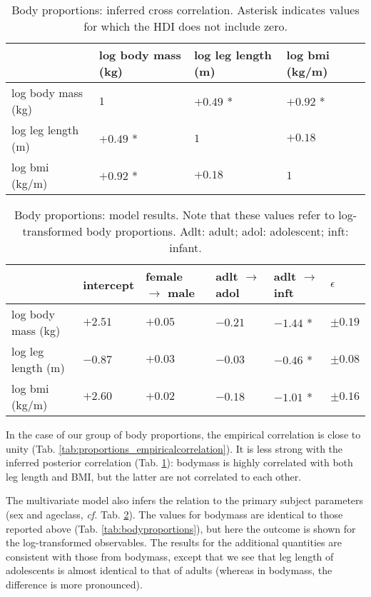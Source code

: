 \begin{table}[htbp]
\caption{\label{tab:proportions_correlation}Body proportions: inferred cross correlation. Asterisk indicates values for which the HDI does not include zero.}
\centering
\begin{tabular}{llll}
 & log body mass (kg) & log leg length (m) & log bmi (kg/m)\\[0pt]
\hline
log body mass (kg) & \(1\) & \(+0.49\) * & \(+0.92\) *\\[0pt]
log leg length (m) & \(+0.49\) * & \(1\) & \(+0.18\)\\[0pt]
log bmi (kg/m) & \(+0.92\) * & \(+0.18\) & \(1\)\\[0pt]
\end{tabular}
\end{table}

\begin{table}[htbp]
\caption{\label{tab:proportions_predictors}Body proportions: model results. Note that these values refer to log-transformed body proportions. Adlt: adult; adol: adolescent; inft: infant.}
\centering
\begin{tabular}{llllll}
 & intercept & female \(\rightarrow\) male & adlt \(\rightarrow\) adol & adlt \(\rightarrow\) inft & \(\epsilon\)\\[0pt]
\hline
log body mass (kg) & \(+2.51\) & \(+0.05\) & \(-0.21\) & \(-1.44\) * & \(\pm 0.19\)\\[0pt]
log leg length (m) & \(-0.87\) & \(+0.03\) & \(-0.03\) & \(-0.46\) * & \(\pm 0.08\)\\[0pt]
log bmi (kg/m) & \(+2.60\) & \(+0.02\) & \(-0.18\) & \(-1.01\) * & \(\pm 0.16\)\\[0pt]
\end{tabular}
\end{table}


In the case of our group of body proportions, the empirical correlation is close to unity (Tab. \ref{tab:proportions_empiricalcorrelation}).
It is less strong with the inferred posterior correlation (Tab. \ref{tab:proportions_correlation}): bodymass is highly correlated with both leg length and BMI, but the latter are not correlated to each other.


The multivariate model also infers the relation to the primary subject parameters (sex and ageclass, \emph{cf.} Tab. \ref{tab:proportions_predictors}).
The values for bodymass are identical to those reported above (Tab. \ref{tab:bodyproportions}), but here the outcome is shown for the log-transformed observables.
The results for the additional quantities are consistent with those from bodymass, except that we see that leg length of adolescents is almost identical to that of adults (whereas in bodymass, the difference is more pronounced).

